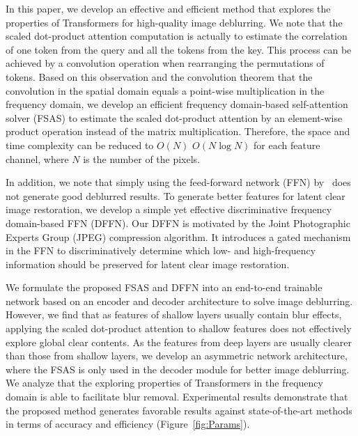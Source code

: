 \documentclass[10pt,twocolumn,letterpaper]{article}
\begin{document}
In this paper, we develop an effective and efficient method that explores the properties of Transformers for high-quality image deblurring.
We note that the scaled dot-product attention computation is actually to estimate the correlation of one token from the query and all the tokens from the key. This process can be achieved by a convolution operation when rearranging the permutations of tokens.
Based on this observation and the convolution theorem that the convolution in the spatial domain equals a point-wise multiplication in the frequency domain,
we develop an efficient frequency domain-based self-attention solver (FSAS) to estimate the scaled dot-product attention by an element-wise product operation instead of the matrix multiplication.
Therefore, the space and time complexity can be reduced to $O(N)$ $O(N\log N)$ for each feature channel, where $N$ is the number of the pixels.


In addition, we note that simply using the feed-forward network (FFN) by~\cite{Restormer} does not generate good deblurred results.
To generate better features for latent clear image restoration, we develop a simple yet effective discriminative frequency domain-based FFN (DFFN).
Our DFFN is motivated by the Joint Photographic Experts Group (JPEG) compression algorithm. It introduces a gated mechanism in the FFN to discriminatively determine which low- and high-frequency information should be preserved for latent clear image restoration.


We formulate the proposed FSAS and DFFN into an end-to-end trainable network based on an encoder and decoder architecture to solve image deblurring.
However, we find that as features of shallow layers usually contain blur effects, applying the scaled dot-product attention to shallow features does not effectively explore global clear contents.
As the features from deep layers are usually clearer than those from shallow layers, we develop an asymmetric network architecture, where the FSAS is only used in the decoder module for better image deblurring.
We analyze that the exploring properties of Transformers in the frequency domain is able to facilitate blur removal. Experimental results demonstrate that the proposed method generates favorable results against state-of-the-art methods in terms of accuracy and efficiency (Figure~\ref{fig:Params}).
\end{document}
